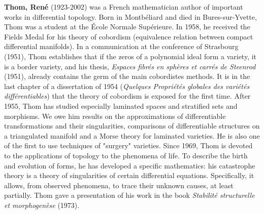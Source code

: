 \textbf{Thom, René} (1923-2002) was a French mathematician author of important works in differential topology. Born in Montbéliard and died in Bures-sur-Yvette, Thom was a student at the École Normale Supérieure. In 1958, he received the Fields Medal for his theory of cobordism (equivalence relation between compact differential manifolds). In a communication at the conference of Strasbourg (1951), Thom establishes that if the zeros of a polynomial ideal form a variety, it is a border variety, and his thesis, \textit{Espaces fibrés en sphères et carrés de Steenrod} (1951), already contains the germ of the main cobordistes methods. It is in the last chapter of a dissertation of 1954 (\textit{Quelques Propriétés globales des variétés différentiables}) that the theory of cobordism is exposed for the first time. After 1955, Thom has studied especially laminated spaces and stratified sets and morphisms. We owe him results on the approximations of differentiable transformations and their singularities, comparisons of differentiable structures on a triangulated manifold and a Morse theory for laminated varieties. He is also one of the first to use techniques of "surgery" varieties. Since 1969, Thom is devoted to the applications of topology to the phenomena of life. To describe the birth and evolution of forms, he has developed a specific mathematics: his catastrophe theory is a theory of singularities of certain differential equations. Specifically, it allows, from observed phenomena, to trace their unknown causes, at least partially. Thom gave a presentation of his work in the book \textit{Stabilité structurelle et morphogenèse} (1973).

